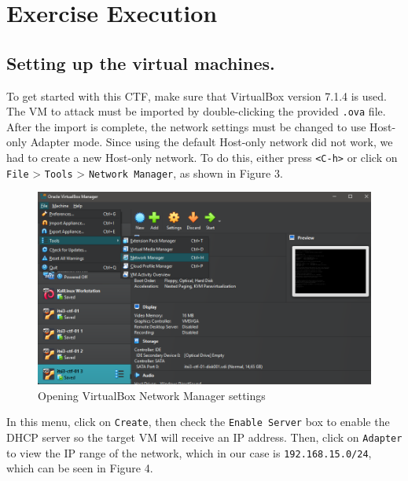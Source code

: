 \documentclass[a4paper]{article}
\newcommand{\abc}{\hfill \break}
\begin{document}
\newpage

\section{Exercise Execution}
\subsection{Setting up the virtual machines.}
To get started with this CTF, make sure that VirtualBox version 7.1.4 is used. The VM to attack must be imported by double-clicking the provided \texttt{.ova} file. After the import is complete, the network settings must be changed to use Host-only Adapter mode. Since using the default Host-only network did not work, we had to create a new Host-only network. To do this, either press \texttt{<C-h>} or click on \texttt{File} > \texttt{Tools} > \texttt{Network Manager}, as shown in Figure 3.
\begin{figure}[h]
	\includegraphics[scale=0.285]{./images/openingNetworkManager.png}
	\centering
	\caption{Opening VirtualBox Network Manager settings}
\end{figure}\abc
In this menu, click on \texttt{Create}, then check the \texttt{Enable Server} box to enable the DHCP server so the target VM will receive an IP address. Then, click on \texttt{Adapter} to view the IP range of the network, which in our case is \texttt{192.168.15.0/24}, which can be seen in Figure 4.
\end{document}
